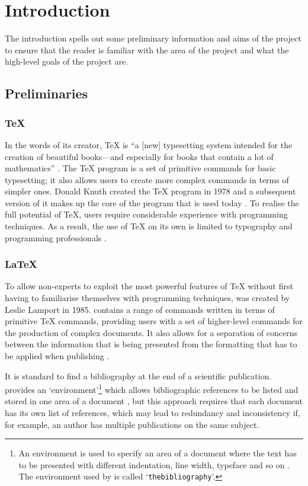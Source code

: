 \chapter{Introduction}
\label{intro}
The introduction spells out some preliminary information and aims of the project to ensure that the reader is familiar with the area of the project and what the high-level goals of the project are.

\section{Preliminaries}
\subsection{\TeX{}}
In the words of its creator, \TeX{} is ``a [new] typesetting system intended for the creation of beautiful books---and especially for books that contain a lot of mathematics'' \cite{DK84}.  The \TeX{} program is a set of primitive commands for basic typesetting; it also allows users to create more complex commands in terms of simpler ones.  Donald Knuth created the \TeX{} program in 1978 and a subsequent version of it makes up the core of the program that is used today \cite{TeXOrigin}.  To realise the full potential of \TeX, users require considerable experience with programming techniques.  As a result, the use of \TeX{} on its own is limited to typography and programming professionals \cite{KD95}.

\subsection{\LaTeX}
To allow non-experts to exploit the most powerful features of \TeX{} without first having to familiarise themselves with programming techniques, \latex was created by Leslie Lamport in 1985. \latex contains a range of commands written in terms of primitive \TeX{} commands, providing users with a set of higher-level commands for the production of complex documents.  It also allows for a separation of concerns between the information that is being presented from the formatting that has to be applied when publishing \cite{KD95}.

It is standard to find a bibliography at the end of a scientific publication. \latex provides an `environment'\footnote{An environment is used to specify an area of a document where the text has to be presented with different indentation, line width, typeface and so on \cite{KD95}.  The environment used by \latex is called `\texttt{thebibliography}'.} which allows bibliographic references to be listed and stored in one area of a document \cite{KD95}, but this approach requires that each document has its own list of references, which may lead to redundancy and inconsistency if, for example, an author has multiple publications on the same subject. 

